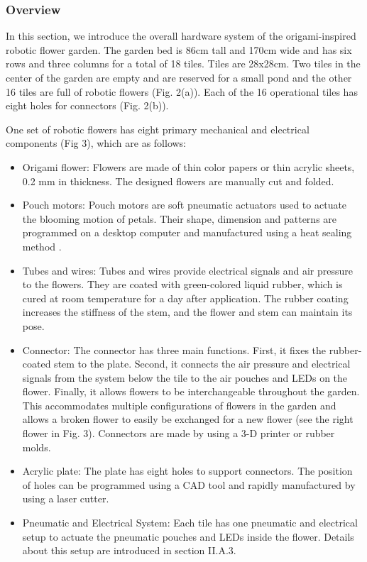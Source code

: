 \documentclass[letterpaper, 10 pt, conference]{ieeeconf}  %
\begin{document}
\subsubsection{\textbf{Overview}}

In this section, we introduce the overall hardware system of the origami-inspired robotic flower garden. The garden bed is 86cm tall and 170cm wide and has six rows and three columns for a total of 18 tiles.  Tiles are 28x28cm. Two tiles in the center of the garden are empty and are reserved for a small pond and the other 16 tiles are full of robotic flowers (Fig. 2(a)). Each of the 16 operational tiles has eight holes for connectors (Fig. 2(b)).

One set of robotic flowers has eight primary mechanical and electrical components (Fig 3), which are as follows:

\begin{itemize}
	\item Origami flower: Flowers are made of thin color papers or thin acrylic sheets, 0.2 mm in thickness. The designed flowers are manually cut and folded.
	\item Pouch motors: Pouch motors are soft pneumatic actuators used to actuate the blooming motion of petals. Their shape, dimension and patterns are programmed on a desktop computer and manufactured using a heat sealing method \cite{NiiyamaICRA2014}.
	\item Tubes and wires: Tubes and wires provide electrical signals and air pressure to the flowers. They are coated with green-colored liquid rubber, which is cured at room temperature for a day after application. The rubber coating increases the stiffness of the stem, and the flower and stem can maintain its pose. 
	\item Connector: The connector has three main functions. First, it fixes the rubber-coated stem to the plate. Second, it connects the air pressure and electrical signals from the system below the tile to the air pouches and LEDs on the flower. Finally, it allows flowers to be interchangeable throughout the garden. This accommodates multiple configurations of flowers in the garden and allows a broken flower to easily be exchanged for a new flower (see the right flower in Fig. 3). Connectors are made by using a 3-D printer or rubber molds.  
	\item Acrylic plate: The plate has eight holes to support connectors. The position of holes can be programmed using a CAD tool and rapidly manufactured by using a laser cutter.
	\item Pneumatic and Electrical System: Each tile has one pneumatic and electrical setup to actuate the pneumatic pouches and LEDs inside the flower. Details about this setup are introduced in section II.A.3.  
\end{itemize}
\end{document}
